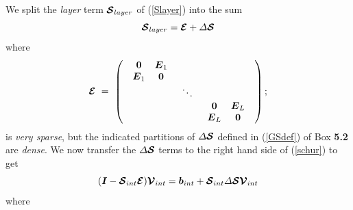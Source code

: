 We split the {\em layer \/} term ${\CB  S}_{{layer}}$ of 
(\ref{Slayer}) into the sum
\begin{equation} \label{Ssplit}
{\CB  S}_{{layer}}={\CB  E}+ {\mit \Delta}{\CB  S}
\end{equation}
where
\begin{equation} \label{GEdef}
{\CB  E} \ =\ \left({\begin{array}{ccc}
\begin{array}{cc}{\bf 0}&{\bmi  E}_{1}\\ 
{\bmi  E}_{1}&{\bf 0}
\end{array}&&\\ 
& \ddots &\\  
&&\begin{array}{cc}{\bf 0}&{\bmi  E}_{L}\\ 
{\bmi  E}_{L}
&{\bf 0}\end{array}
\end{array}}\right);
\end{equation}
is {\em very sparse\/}, but the indicated partitions of 
${\mit \Delta}{\CB  S}$ defined in (\ref{GSdef}) of {\sc Box} {\bf 5.2} are {\em dense\/}.
We now transfer the ${\mit \Delta}{\CB  S}$ terms to the right hand side of 
(\ref{schur}) to get
\begin{equation} \label{eqn100}
({\bmi  I}-{\CB  S}_{{int}}{\CB  E}){\CB  V}_{{int}}={\bmi  
b}_{{int}}+{\CB  S}_{{int}}{\mit \Delta}{\CB  S}{\CB  V}_{{int}}
\end{equation}
where

